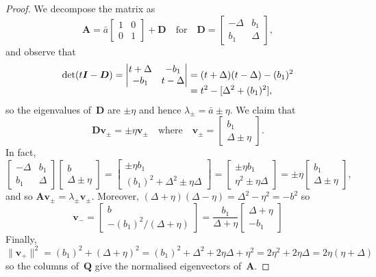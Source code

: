 \documentclass[12pt,a4paper]{article}
\newcommand{\bs}[1]{\boldsymbol{#1}}
\begin{document}
\begin{proof}
We decompose the matrix as
\begin{equation}\label{eq: sub-block}
\bs{A}=\bar a\begin{bmatrix}1&0\\0&1\end{bmatrix}+\bs{D}
\quad\text{for}\quad
\bs{D}=\begin{bmatrix}-\Delta&b_1\\ b_1&\Delta\end{bmatrix},
\end{equation}
and observe that
\begin{align*}
\det(t\bs{I}-\bs{D})
	=\smash[b]{\begin{vmatrix}t+\Delta&-b_1\\ -b_1&t-\Delta\end{vmatrix}}
&=(t+\Delta)(t-\Delta)-(b_1)^2\\
&=t^2-[\Delta^2+(b_1)^2],
\end{align*}
so the eigenvalues of~$\bs{D}$ are $\pm\eta$ and hence
$\lambda_\pm=\bar a\pm\eta$.  We claim that
\[
\bs{D}\bs{v}_\pm=\pm\eta\bs{v}_\pm
\quad\text{where}\quad\bs{v}_\pm
	=\begin{bmatrix}b_1\\ \Delta\pm\eta\end{bmatrix}.
\]
In fact,
\[
\begin{bmatrix}-\Delta&b_1\\b_1&\Delta\end{bmatrix}
\begin{bmatrix}b\\ \Delta\pm\eta\end{bmatrix}
=\begin{bmatrix}\pm\eta b_1\\ (b_1)^2+\Delta^2\pm\eta\Delta \end{bmatrix}
=\begin{bmatrix}\pm\eta b_1\\ \eta^2\pm\eta\Delta \end{bmatrix}
=\pm\eta\begin{bmatrix}b_1\\ \Delta\pm\eta \end{bmatrix},
\]
and so $\bs{A}\bs{v}_\pm=\lambda_\pm\bs{v}_\pm$.  Moreover,
$(\Delta+\eta)(\Delta-\eta)=\Delta^2-\eta^2=-b^2$ so
\[
\bs{v}_-=\begin{bmatrix}b\\ -(b_1)^2/(\Delta+\eta) \end{bmatrix}
	=\frac{b_1}{\Delta+\eta}\begin{bmatrix}\Delta+\eta\\ -b_1\end{bmatrix}
\]
Finally,
$\|\bs{v}_+\|^2=(b_1)^2+(\Delta+\eta)^2=(b_1)^2+\Delta^2+2\eta\Delta+\eta^2
=2\eta^2+2\eta\Delta=2\eta(\eta+\Delta)$
so the columns of~$\bs{Q}$ give the normalised eigenvectors of~$\bs{A}$.
\end{proof}
\end{document}
